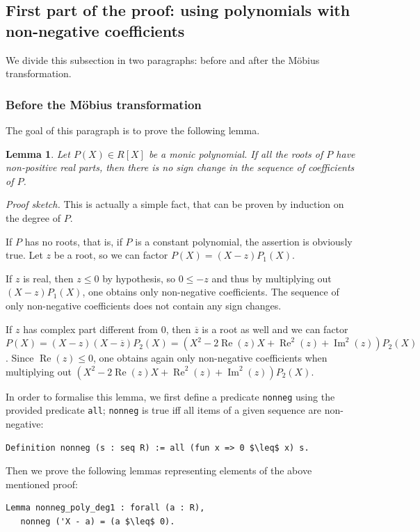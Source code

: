 \documentclass[11pt, a4paper]{article}
\newtheorem{lemma}[mtheorem]{Lemma}
\DeclareMathOperator{\Rea}{Re}
\DeclareMathOperator{\Ima}{Im}
\newcommand{\ol}{\overline}
\begin{document}
\subsection{First part of the proof: using polynomials with non-negative coefficients}
\label{first_coq}

We divide this subsection in two paragraphs: before and after the M\"obius transformation.

\subsubsection{Before the M\"obius transformation}

The goal of this paragraph is to prove the following lemma.
\begin{lemma}
Let $P(X) \in R[X]$ be a monic polynomial. If all the roots of $P$ have non-positive real parts, then there is no sign change in the sequence of coefficients of $P$.
\label{lemma239}
\end{lemma}

\textit{Proof sketch.} This is actually a simple fact, that can be proven by induction on the degree of $P$. 

If $P$ has no roots, that is, if $P$ is a constant polynomial, the assertion is obviously true.
Let $z$ be a root, so we can factor $P(X) = (X - z) P_1(X)$.

If $z$ is real, then $z \leq 0$ by hypothesis, so $0 \leq -z$ and thus by multiplying out $(X - z) P_1(X)$, one obtains only non-negative coefficients. The sequence of only non-negative coefficients does not contain any sign changes.

If $z$ has complex part different from 0, then $\ol{z}$ is a root as well and we can factor $P(X) = (X - z)(X-\ol{z}) P_2(X) = (X^2 -2 \Rea(z)X + \Rea^2(z) + \Ima^2(z)) P_2(X)$. Since $\Rea(z) \leq 0$, one obtains again only non-negative coefficients when multiplying out $(X^2 -2 \Rea(z)X + \Rea^2(z) + \Ima^2(z)) P_2(X)$.

In order to formalise this lemma, we first define a predicate \lstinline!nonneg! using the provided predicate \lstinline!all!; \lstinline!nonneg! is true iff all items of a given sequence are non-negative:
\begin{lstlisting}
Definition nonneg (s : seq R) := all (fun x => 0 $\leq$ x) s.
\end{lstlisting}
Then we prove the following lemmas representing elements of the above mentioned proof:
\begin{lstlisting}
Lemma nonneg_poly_deg1 : forall (a : R),
   nonneg ('X - a) = (a $\leq$ 0).
\end{lstlisting}
\end{document}
